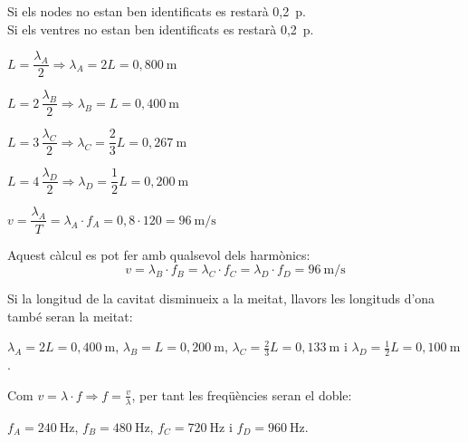 \begin{solapartat}
Si els nodes no estan ben identificats es restarà 0,2~p.\\
Si els ventres no estan ben identificats es restarà 0,2~p.

 $L = \dfrac{\lambda_A}{2} \Rightarrow \lambda_A = 2L = 0,800\ \mathrm{m}$

 $L = 2\,\dfrac{\lambda_B}{2} \Rightarrow \lambda_B = L = 0,400\ \mathrm{m}$

 $L = 3\,\dfrac{\lambda_C}{2} \Rightarrow \lambda_C = \dfrac{2}{3}L = 0,267\ \mathrm{m}$

 $L = 4\,\dfrac{\lambda_D}{2} \Rightarrow \lambda_D = \dfrac{1}{2}L = 0,200\ \mathrm{m}$

 $v = \dfrac{\lambda_A}{T} = \lambda_A\cdot f_A = 0,8\cdot 120 = 96\ \mathrm{m/s}$

Aquest càlcul es pot fer amb qualsevol dels harmònics:
\[ v = \lambda_B\cdot f_B = \lambda_C\cdot f_C = \lambda_D\cdot f_D = 96\ \mathrm{m/s} \]
\end{solapartat}

\begin{solapartat}
 Si la longitud de la cavitat disminueix a la meitat, llavors les longituds d'ona també seran la meitat:

$\lambda_A = 2L = 0,400\ \mathrm{m}$, $\lambda_B = L = 0,200\ \mathrm{m}$, $\lambda_C = \frac{2}{3}L = 0,133\ \mathrm{m}$ i $\lambda_D = \frac{1}{2}L = 0,100\ \mathrm{m}$.

 Com $v = \lambda\cdot f \Rightarrow f = \frac{v}{\lambda}$, per tant les freqüències seran el doble:

$f_A = 240\ \mathrm{Hz}$, $f_B = 480\ \mathrm{Hz}$, $f_C = 720\ \mathrm{Hz}$ i $f_D = 960\ \mathrm{Hz}$.
\end{solapartat}
